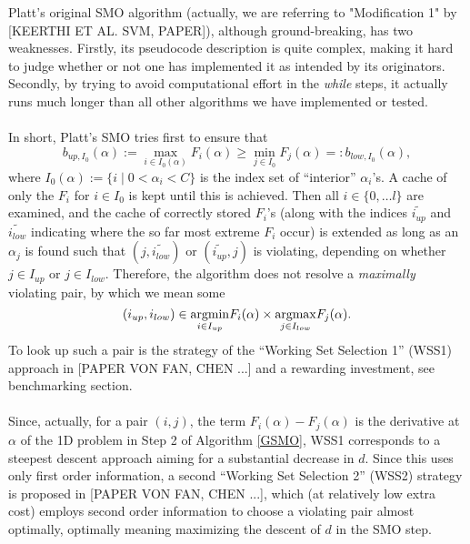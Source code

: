 Platt's original SMO algorithm (actually, we are referring to "Modification 1" by \cite{keerthisvm}[KEERTHI ET AL. SVM, PAPER]), although ground-breaking, has two weaknesses. Firstly, its pseudocode description is quite complex, making it hard to judge whether or not one has implemented it as intended by its originators. Secondly, by trying to avoid computational effort in the \textit{while} steps, it actually runs much longer than all other algorithms we have implemented or tested.\\\\
In short, Platt's SMO tries first to ensure that
\[
b_{up,I_0}(\alpha) := \max_{i \in I_0(\alpha)} F_i(\alpha) \geq \min_{j \in I_0} F_j(\alpha) =: b_{low,I_0}(\alpha),
\]
where $I_0(\alpha) := \{ i  \mid  0 < \alpha_i < C \}$ is the index set of ``interior'' $\alpha_i$'s. A cache of only the $F_i$ for $i \in I_0$ is kept until this is achieved. Then all $i \in \{0,\ldots l\}$ are examined, and the cache of correctly stored $F_i$'s (along with the indices $\widetilde{i_{up}}$ and $\widetilde{i_{low}}$ indicating where the so far most extreme $F_i$ occur) is extended as long as an $\alpha_j$ is found such that $(j,\widetilde{i_{low}})$ or $(\widetilde{i_{up}},j)$ is violating, depending on whether $j \in I_{up}$ or $j \in I_{low}$. Therefore, the algorithm does not resolve a \textit{maximally} violating pair, by which we mean some 
\begin{equation*}
(i_{up},i_{low}) \in \underset{i \in I_{up}}{\operatorname{argmin}}F_i(\alpha) \times \underset{j \in I_{low}}{\operatorname{argmax}}F_j(\alpha).
\end{equation*} To look up such a pair is the strategy of the ``Working Set Selection 1'' (WSS1) approach in [PAPER VON FAN, CHEN ...] and a rewarding investment, see benchmarking section. \\\\
Since, actually, for a pair $(i,j)$, the term $F_i(\alpha) - F_j(\alpha)$ is the derivative at $\alpha$ of the 1D problem in Step 2 of Algorithm \ref{GSMO}, WSS1 corresponds to a steepest descent approach aiming for a substantial decrease in $d$. Since this uses only first order information, a second ``Working Set Selection 2'' (WSS2) strategy is proposed in [PAPER VON FAN, CHEN ...], which (at relatively low extra cost) employs second order information to choose a violating pair almost optimally, optimally meaning maximizing the descent of $d$ in the SMO step.
